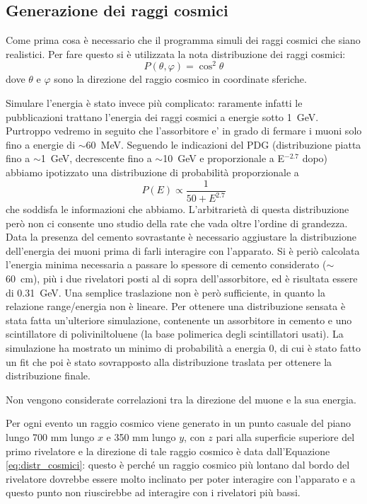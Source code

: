 \subsection{Generazione dei raggi cosmici}
Come prima cosa è necessario che il programma simuli dei raggi cosmici che siano realistici. Per fare questo si è utilizzata la nota distribuzione dei raggi cosmici:
\begin{equation}
	P\left(\theta, \varphi\right) = \cos^2{\theta}
	\label{eq:distr_cosmici}
\end{equation}
dove $\theta$ e $\varphi$ sono la direzione del raggio cosmico in coordinate sferiche.

Simulare l'energia \`e stato invece pi\`u complicato: raramente infatti le pubblicazioni trattano l'energia dei raggi cosmici a energie sotto 1~GeV. Purtroppo vedremo in seguito che l'assorbitore e' in grado di fermare i muoni solo fino a energie di $\sim $60~MeV. Seguendo le indicazioni del PDG \cite{bib:Patrignani:2016xqp} (distribuzione piatta fino a $\sim $1~GeV, decrescente fino a $\sim $10~GeV e proporzionale a E$^{-2.7}$ dopo) abbiamo ipotizzato una distribuzione di probabilit\`a proporzionale a 
\begin{equation}
	P\left(E\right) \propto \frac{1}{50+E^{2.7}}
	\label{eq:distr_cosmici_en}
\end{equation}
che soddisfa le informazioni che abbiamo. L'arbitrariet\`a di questa distribuzione per\`o non ci consente uno studio della rate che vada oltre l'ordine di grandezza.
Data la presenza del cemento sovrastante \`e necessario aggiustare la distribuzione dell'energia dei muoni prima di farli interagire con l'apparato. Si \`e peri\`o calcolata l'energia minima necessaria a passare lo spessore di cemento considerato ($\sim$60~cm), pi\`u i due rivelatori posti al di sopra dell'assorbitore, ed \`e risultata essere di 0.31~GeV. Una semplice traslazione non \`e per\`o sufficiente, in quanto la relazione range/energia non \`e lineare. Per ottenere una distribuzione sensata \`e stata fatta un'ulteriore simulazione, contenente un assorbitore in cemento e uno scintillatore di poliviniltoluene (la base polimerica degli scintillatori usati). La simulazione ha mostrato un minimo di probabilit\`a a energia 0, di cui \`e stato fatto un fit che poi \`e stato sovrapposto alla distribuzione traslata per ottenere la distribuzione finale.

Non vengono considerate correlazioni tra la direzione del muone e la sua energia.

Per ogni evento un raggio cosmico viene generato in un punto casuale del piano lungo 700 mm lungo $x$ e 350 mm lungo $y$, con $z$ pari alla superficie superiore del primo rivelatore e la direzione di tale raggio cosmico è data dall'Equazione \ref{eq:distr_cosmici}: questo \`e perch\'e un raggio cosmico pi\`u lontano dal bordo del rivelatore dovrebbe essere molto inclinato per poter interagire con l'apparato e a questo punto non riuscirebbe ad interagire con i rivelatori pi\`u bassi.

